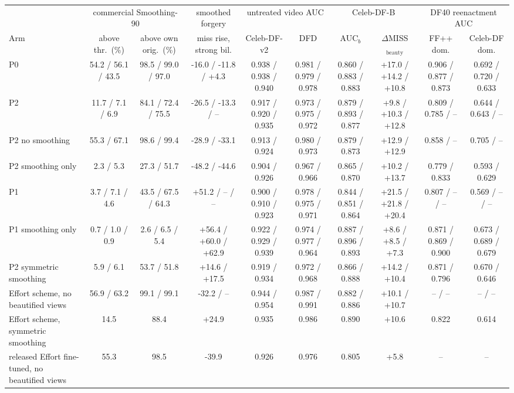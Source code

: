 \begin{tabular}{@{}l cc c cc cc cc@{}}
\toprule
 & \multicolumn{2}{c}{commercial Smoothing-90} & smoothed forgery & \multicolumn{2}{c}{untreated video AUC} & \multicolumn{2}{c}{Celeb-DF-B} & \multicolumn{2}{c}{DF40 reenactment AUC} \\
\cmidrule(lr){2-3}\cmidrule(lr){5-6}\cmidrule(lr){7-8}\cmidrule(lr){9-10}
Arm & above thr.\ (\%) & above own orig.\ (\%) & miss rise, strong bil. & Celeb-DF-v2 & DFD & AUC$_b$ & $\Delta$MISS$_\text{beauty}$ & FF++ dom. & Celeb-DF dom. \\
\midrule
P0 & 54.2 / 56.1 / 43.5 & 98.5 / 99.0 / 97.0 & -16.0 / -11.8 / +4.3 & 0.938 / 0.938 / 0.940 & 0.981 / 0.979 / 0.978 & 0.860 / 0.883 / 0.883 & +17.0 / +14.2 / +10.8 & 0.906 / 0.877 / 0.873 & 0.692 / 0.720 / 0.633 \\
P2 & 11.7 / 7.1 / 6.9 & 84.1 / 72.4 / 75.5 & -26.5 / -13.3 / -- & 0.917 / 0.920 / 0.935 & 0.973 / 0.975 / 0.972 & 0.879 / 0.893 / 0.877 & +9.8 / +10.3 / +12.8 & 0.809 / 0.785 / -- & 0.644 / 0.643 / -- \\
P2 no smoothing & 55.3 / 67.1 & 98.6 / 99.4 & -28.9 / -33.1 & 0.913 / 0.924 & 0.980 / 0.973 & 0.879 / 0.873 & +12.9 / +12.9 & 0.858 / -- & 0.705 / -- \\
P2 smoothing only & 2.3 / 5.3 & 27.3 / 51.7 & -48.2 / -44.6 & 0.904 / 0.926 & 0.967 / 0.966 & 0.865 / 0.870 & +10.2 / +13.7 & 0.779 / 0.833 & 0.593 / 0.629 \\
P1 & 3.7 / 7.1 / 4.6 & 43.5 / 67.5 / 64.3 & +51.2 / -- / -- & 0.900 / 0.910 / 0.923 & 0.978 / 0.975 / 0.971 & 0.844 / 0.851 / 0.864 & +21.5 / +21.8 / +20.4 & 0.807 / -- / -- & 0.569 / -- / -- \\
P1 smoothing only & 0.7 / 1.0 / 0.9 & 2.6 / 6.5 / 5.4 & +56.4 / +60.0 / +62.9 & 0.922 / 0.929 / 0.939 & 0.974 / 0.977 / 0.964 & 0.887 / 0.896 / 0.893 & +8.6 / +8.5 / +7.3 & 0.871 / 0.869 / 0.900 & 0.673 / 0.689 / 0.679 \\
P2 symmetric smoothing & 5.9 / 6.1 & 53.7 / 51.8 & +14.6 / +17.5 & 0.919 / 0.934 & 0.972 / 0.968 & 0.866 / 0.888 & +14.2 / +10.4 & 0.871 / 0.796 & 0.670 / 0.646 \\
Effort scheme, no beautified views & 56.9 / 63.2 & 99.1 / 99.1 & -32.2 / -- & 0.944 / 0.954 & 0.987 / 0.991 & 0.882 / 0.886 & +10.1 / +10.7 & -- / -- & -- / -- \\
Effort scheme, symmetric smoothing & 14.5 & 88.4 & +24.9 & 0.935 & 0.986 & 0.890 & +10.6 & 0.822 & 0.614 \\
released Effort fine-tuned, no beautified views & 55.3 & 98.5 & -39.9 & 0.926 & 0.976 & 0.805 & +5.8 & -- & -- \\

\end{tabular}
